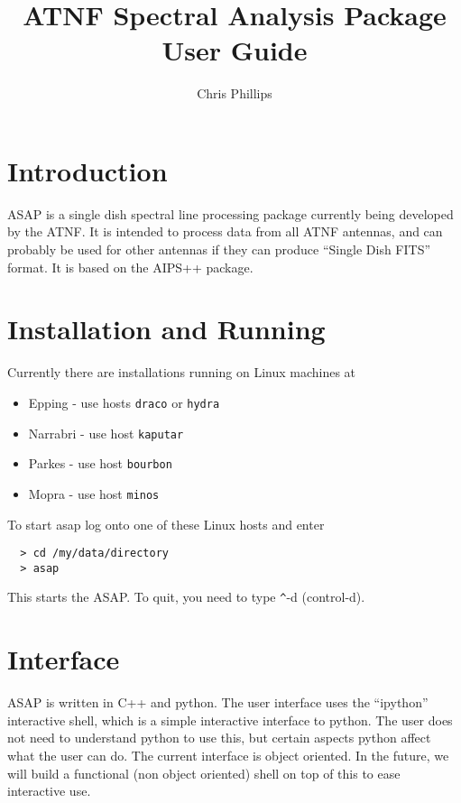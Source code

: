 \documentclass[11pt]{article}
\title{ATNF Spectral Analysis Package\\User Guide }
\author{Chris Phillips}
\begin{document}
\maketitle

\section{Introduction}

ASAP is a single dish spectral line processing package currently being
developed by the ATNF. It is intended to process data from all ATNF
antennas, and can probably be used for other antennas if they can
produce ``Single Dish FITS'' format. It is based on the AIPS++
package.



\section{Installation and Running}

Currently there are installations running on Linux machines at

\begin{itemize}
\item Epping - use hosts {\tt draco} or {\tt hydra}
\item Narrabri - use host {\tt kaputar}
\item Parkes - use host {\tt bourbon}
\item Mopra - use host {\tt minos}
\end{itemize}

To start asap log onto one of these Linux hosts and enter

\begin{verbatim}
  > cd /my/data/directory
  > asap
\end{verbatim}

This starts the ASAP. To quit, you need to type \verb+^+-d
(control-d).

\section{Interface}

ASAP is written in C++ and python. The user interface uses the
``ipython'' interactive shell, which is a simple interactive interface
to python. The user does not need to understand python to use this,
but certain aspects python affect what the user can do.  The current
interface is object oriented.  In the future, we will build a
functional (non object oriented) shell on top of this to ease
interactive use.
\end{document}
